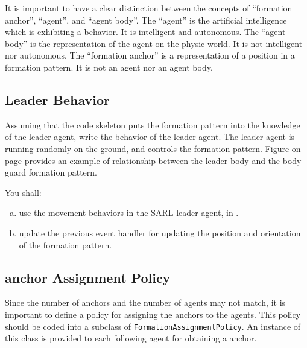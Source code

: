 \documentclass[article,english,nodocumentinfo]{multiagentfrreport}
\begin{document}
\begin{upmcaution}
 It is important to have a clear distinction between the concepts of ``formation anchor'', ``agent'', and ``agent body''. \newline\newline
The ``agent'' is the artificial intelligence which is exhibiting a behavior. It is intelligent and autonomous. \newline\newline
The ``agent body'' is the representation of the agent on the physic world. It is not intelligent nor autonomous. \newline\newline
The ``formation anchor'' is a representation of a position in a formation pattern. It is not an agent nor an agent body.
\end{upmcaution}

\subsection{Leader Behavior}

Assuming that the code skeleton puts the formation pattern into the knowledge of the leader agent, write the behavior of the leader agent.
The leader agent is running randomly on the ground, and controls the formation pattern.
Figure  on page  provides an example of relationship between the leader body and the body guard formation pattern.


You shall:
\begin{enumerate}[a)]
\item use the movement behaviors in the SARL leader agent, in .
\item update the previous event handler for updating the position and orientation of the formation pattern.
\end{enumerate}

\subsection{anchor Assignment Policy}

Since the number of anchors and the number of agents may not match, it is important to define a policy for assigning the anchors to the agents.
This policy should be coded into a subclass of \texttt{FormationAssignmentPolicy}.
An instance of this class is provided to each following agent for obtaining a anchor.
\end{document}
